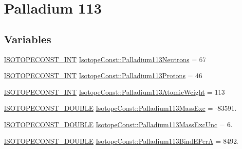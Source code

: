 \hypertarget{group___isotope_const-_palladium-_pd113}{}\section{Palladium 113}
\label{group___isotope_const-_palladium-_pd113}
\subsection*{Variables}
\begin{DoxyCompactItemize}
\item 
\mbox{\hyperlink{group___isotope_const-_macros_ga5f18360b3e99483a35c32d789e62621c}{I\+S\+O\+T\+O\+P\+E\+C\+O\+N\+S\+T\+\_\+\+I\+NT}} \mbox{\hyperlink{group___isotope_const-_palladium-_pd113_gaff7f0de4d63138ceab4d08e4b09f7ea0}{Isotope\+Const\+::\+Palladium113\+Neutrons}} = 67
\item 
\mbox{\hyperlink{group___isotope_const-_macros_ga5f18360b3e99483a35c32d789e62621c}{I\+S\+O\+T\+O\+P\+E\+C\+O\+N\+S\+T\+\_\+\+I\+NT}} \mbox{\hyperlink{group___isotope_const-_palladium-_pd113_ga70de02888e3e39a6d9fd7ffc0ca9d21b}{Isotope\+Const\+::\+Palladium113\+Protons}} = 46
\item 
\mbox{\hyperlink{group___isotope_const-_macros_ga5f18360b3e99483a35c32d789e62621c}{I\+S\+O\+T\+O\+P\+E\+C\+O\+N\+S\+T\+\_\+\+I\+NT}} \mbox{\hyperlink{group___isotope_const-_palladium-_pd113_gac5de831ca97a2f1db1a06e5aca3cde0e}{Isotope\+Const\+::\+Palladium113\+Atomic\+Weight}} = 113
\item 
\mbox{\hyperlink{group___isotope_const-_macros_ga8f45a7272ce02c0b4c65c44636ed719a}{I\+S\+O\+T\+O\+P\+E\+C\+O\+N\+S\+T\+\_\+\+D\+O\+U\+B\+LE}} \mbox{\hyperlink{group___isotope_const-_palladium-_pd113_gaa65122bfe95d60383913145338d7be80}{Isotope\+Const\+::\+Palladium113\+Mass\+Exc}} = -\/83591.
\item 
\mbox{\hyperlink{group___isotope_const-_macros_ga8f45a7272ce02c0b4c65c44636ed719a}{I\+S\+O\+T\+O\+P\+E\+C\+O\+N\+S\+T\+\_\+\+D\+O\+U\+B\+LE}} \mbox{\hyperlink{group___isotope_const-_palladium-_pd113_ga767afe5cdb598159783255fa499ccb3e}{Isotope\+Const\+::\+Palladium113\+Mass\+Exc\+Unc}} = 6.
\item 
\mbox{\hyperlink{group___isotope_const-_macros_ga8f45a7272ce02c0b4c65c44636ed719a}{I\+S\+O\+T\+O\+P\+E\+C\+O\+N\+S\+T\+\_\+\+D\+O\+U\+B\+LE}} \mbox{\hyperlink{group___isotope_const-_palladium-_pd113_ga7ba8543cf51f3d80ada9d4999f4f032b}{Isotope\+Const\+::\+Palladium113\+Bind\+E\+PerA}} = 8492.
\item 

\end{DoxyCompactItemize}
